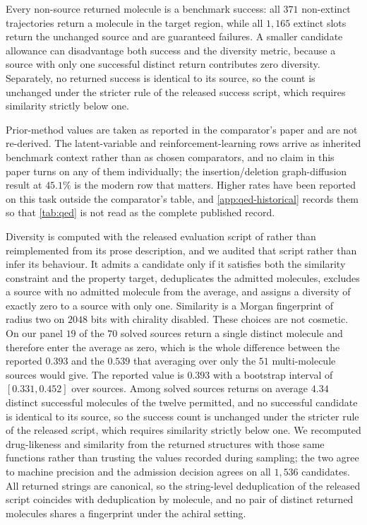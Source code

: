 Every non-source returned molecule is a benchmark success: all $371$ non-extinct trajectories return a molecule in the target region, while all $1{,}165$ extinct slots return the unchanged source and are guaranteed failures. A smaller candidate allowance can disadvantage both success and the diversity metric, because a source with only one successful distinct return contributes zero diversity. Separately, no returned success is identical to its source, so the count is unchanged under the stricter rule of the released success script, which requires similarity strictly below one.

Prior-method values are taken as reported in the comparator's paper and are not re-derived. The latent-variable and reinforcement-learning rows arrive as inherited benchmark context rather than as chosen comparators, and no claim in this paper turns on any of them individually; the insertion/deletion graph-diffusion result at $45.1\%$ is the modern row that matters. Higher rates have been reported on this task outside the comparator's table, and \cref{app:qed-historical} records them so that \cref{tab:qed} is not read as the complete published record.

Diversity is computed with the released evaluation script of \citet{jin2019vjtnn} rather than reimplemented from its prose description, and we audited that script rather than infer its behaviour. It admits a candidate only if it satisfies both the similarity constraint and the property target, deduplicates the admitted molecules, excludes a source with no admitted molecule from the average, and assigns a diversity of exactly zero to a source with only one. Similarity is a Morgan fingerprint of radius two on $2048$ bits with chirality disabled. These choices are not cosmetic. On our panel $19$ of the $70$ solved sources return a single distinct molecule and therefore enter the average as zero, which is the whole difference between the reported $0.393$ and the $0.539$ that averaging over only the $51$ multi-molecule sources would give. The reported value is $0.393$ with a bootstrap interval of $[0.331,0.452]$ over sources. Among solved sources \method{} returns on average $4.34$ distinct successful molecules of the twelve permitted, and no successful candidate is identical to its source, so the success count is unchanged under the stricter rule of the released script, which requires similarity strictly below one. We recomputed drug-likeness and similarity from the returned structures with those same functions rather than trusting the values recorded during sampling; the two agree to machine precision and the admission decision agrees on all $1{,}536$ candidates. All returned strings are canonical, so the string-level deduplication of the released script coincides with deduplication by molecule, and no pair of distinct returned molecules shares a fingerprint under the achiral setting.


